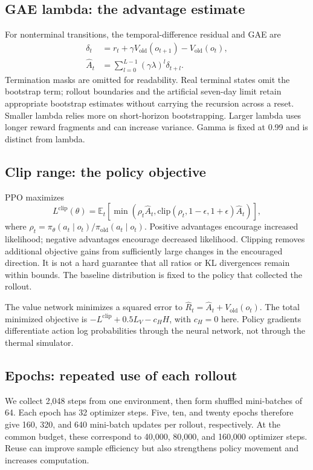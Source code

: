 \documentclass[10pt,a4paper]{article}
\begin{document}
\subsection*{GAE lambda: the advantage estimate}
For nonterminal transitions, the temporal-difference residual and GAE are
\begin{align}
\delta_t &= r_t+\gamma V_{\mathrm{old}}(o_{t+1})-V_{\mathrm{old}}(o_t),\\
\hat A_t &= \sum_{l=0}^{L-1}(\gamma\lambda)^l\delta_{t+l}.
\end{align}
Termination masks are omitted for readability. Real terminal states omit the bootstrap term; rollout boundaries and the artificial seven-day limit retain appropriate bootstrap estimates without carrying the recursion across a reset. Smaller lambda relies more on short-horizon bootstrapping. Larger lambda uses longer reward fragments and can increase variance. Gamma is fixed at 0.99 and is distinct from lambda.

\subsection*{Clip range: the policy objective}
PPO maximizes
\begin{equation}
L^{\mathrm{clip}}(\theta)=\mathbb{E}_t\!\left[\min\!\left(\rho_t\hat A_t,
\mathrm{clip}(\rho_t,1-\epsilon,1+\epsilon)\hat A_t\right)\right],
\end{equation}
where $\rho_t=\pi_\theta(a_t\mid o_t)/\pi_{\mathrm{old}}(a_t\mid o_t)$. Positive advantages encourage increased likelihood; negative advantages encourage decreased likelihood. Clipping removes additional objective gains from sufficiently large changes in the encouraged direction. It is not a hard guarantee that all ratios or KL divergences remain within bounds. The baseline distribution is fixed to the policy that collected the rollout.

The value network minimizes a squared error to $\hat R_t=\hat A_t+V_{\mathrm{old}}(o_t)$. The total minimized objective is $-L^{\mathrm{clip}}+0.5L_V-c_H H$, with $c_H=0$ here. Policy gradients differentiate action log probabilities through the neural network, not through the thermal simulator.

\subsection*{Epochs: repeated use of each rollout}
We collect 2,048 steps from one environment, then form shuffled mini-batches of 64. Each epoch has 32 optimizer steps. Five, ten, and twenty epochs therefore give 160, 320, and 640 mini-batch updates per rollout, respectively. At the common budget, these correspond to 40,000, 80,000, and 160,000 optimizer steps. Reuse can improve sample efficiency but also strengthens policy movement and increases computation.
\end{document}
